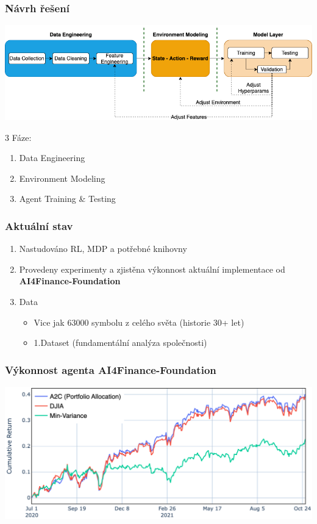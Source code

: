 \begin{frame}
    \frametitle{Návrh řešení}

    \begin{center}
        \centering
        \includegraphics[width=\textwidth]{img/navrh_reseni}
    \end{center}
    {\Large 3 Fáze:}
    \begin{enumerate}
        \item Data Engineering
        \item Environment Modeling
        \item Agent Training \& Testing
    \end{enumerate}
\end{frame}

\begin{frame}
    \frametitle{Aktuální stav}
    \begin{enumerate}
        \itemsep1em
        \item Nastudováno RL, MDP a potřebné knihovny
        \item Provedeny experimenty a zjistěna výkonnost aktuální implementace od \textbf{AI4Finance-Foundation}
        \item Data
        \begin{itemize}
            \item Vice jak 63000 symbolu z celého světa (historie 30+ let)
            \item 1.Dataset (fundamentální analýza společnosti)
        \end{itemize}
    \end{enumerate}
\end{frame}

\begin{frame}
    \frametitle{Výkonnost agenta \textbf{AI4Finance-Foundation}}

    \begin{center}
        \centering
        \includegraphics[width=\textwidth]{img/2}
    \end{center}
\end{frame}


